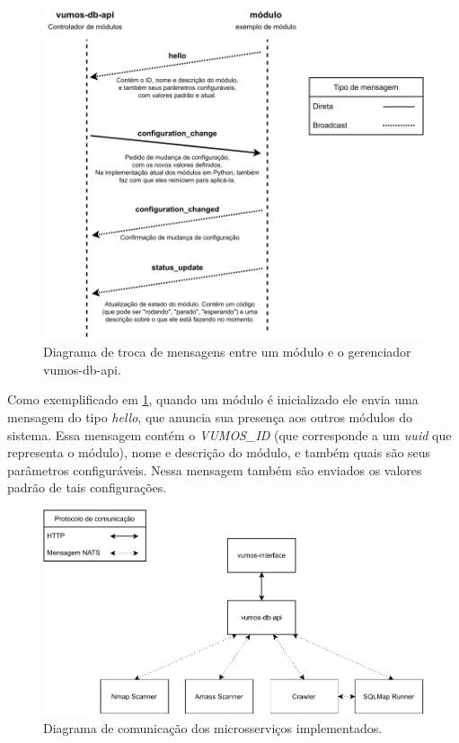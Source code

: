     \begin{figure}
        \includegraphics[scale=0.8]{figuras/vumos-module-communication.drawio.pdf}
        \caption{Diagrama de troca de mensagens entre um módulo e o gerenciador vumos-db-api.\label{fig:module-communication}}
    \end{figure}
    
    Como exemplificado em \ref{fig:module-communication}, quando um módulo é inicializado ele envia uma mensagem do tipo \textit{hello}, que anuncia sua presença aos outros módulos do sistema. Essa mensagem contém o \textit{VUMOS_ID} (que corresponde a um \textit{uuid} que representa o módulo), nome e descrição do módulo, e também quais são seus parâmetros configuráveis. Nessa mensagem também são enviados os valores padrão de tais configurações.

    
    \begin{figure}
        \includegraphics[scale=0.8]{figuras/vumos-Microservices.pdf}
        \caption{Diagrama de comunicação dos microsserviços implementados.\label{fig:microservices}}
    \end{figure}
    
